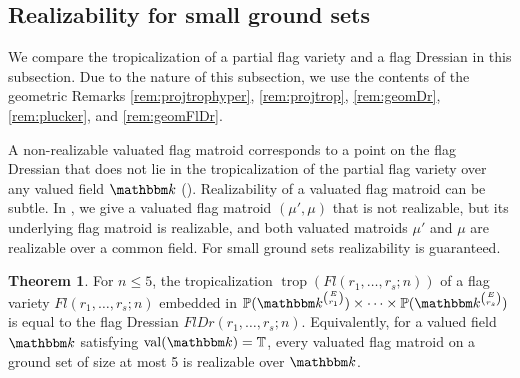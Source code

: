 \documentclass[11pt]{amsart}
\newcommand{\PP}{\mathbb P}
\newcommand{\TT}{\mathbb T}
\newcommand{\trop}{\operatorname{trop}}
\newcommand{\kk}{\mathbbm k}
\theoremstyle{definition}
\newtheorem{thm}{Theorem}[subsection]
\newcommand{\chris}[1]{{\color{cyan} \sf Chris: [#1]}}
\begin{document}
\subsection{Realizability for small ground sets}
\label{subsec:smallground}

We compare the tropicalization of a partial flag variety and a flag Dressian in this subsection.  Due to the nature of this subsection, we use the contents of the geometric Remarks \ref{rem:projtrophyper}, \ref{rem:projtrop}, \ref{rem:geomDr}, \ref{rem:plucker}, and \ref{rem:geomFlDr}.

\medskip
A non-realizable valuated flag matroid corresponds to a point on the flag Dressian that does not lie in the tropicalization of the partial flag variety over any valued field $\kk$ ().
Realizability of a valuated flag matroid can be subtle. In , we give a valuated flag matroid $(\mu',\mu)$ that is not realizable, but its underlying flag matroid is realizable, and both valuated matroids $\mu'$ and $\mu$ are realizable over a common field.  For small ground sets realizability is guaranteed.   %

\begin{thm}\label{thm:Fl=FlDr}
For $n\leq 5$, the tropicalization $\trop(Fl(r_1, \ldots, r_s;n))$ of a flag variety $Fl(r_1, \ldots, r_s;n)$ embedded in $\PP(\kk^{E\choose r_1}) \times \cdots \times \PP(\kk^{E\choose r_s})$ is equal to the flag Dressian $FlDr(r_1, \ldots, r_s;n)$.  Equivalently, for a valued field $\kk$ satisfying $\operatorname{val}(\kk) = \TT$, every valuated flag matroid on a ground set of size at most 5 is realizable over $\kk$.
\end{thm}
\end{document}
